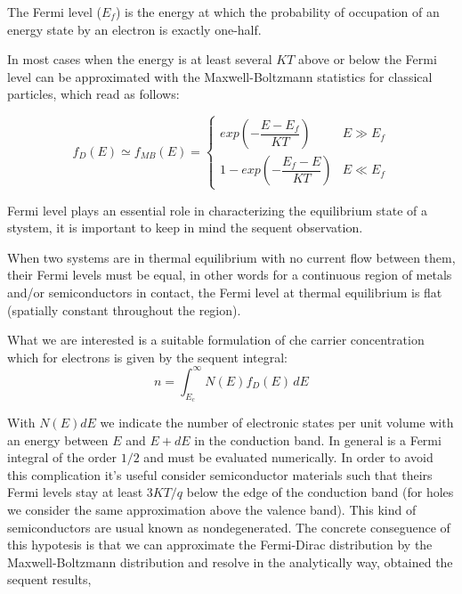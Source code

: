 \begin{Definizione}
The Fermi level ($E_f$) is the energy at which the probability of occupation of an energy state by an electron is exactly one-half.
\end{Definizione}

In most cases when the energy is at least several $KT$ above or below the Fermi level  can be approximated with the Maxwell-Boltzmann statistics for classical particles, which read as follows:

\begin{equation}
\label{eq: maxwell distribution}
f_D(E)\simeq f_{MB}(E) = 
\begin{cases}
exp\left(-\dfrac{E-E_f}{KT}\right) & E\gg E_f \\
1-exp\left(-\dfrac{E_f-E}{KT}\right) & E \ll E_f
\end{cases}
\end{equation}

Fermi level plays an essential role in characterizing the equilibrium state of a stystem, it is important to keep in mind the sequent observation.

\begin{Osservazione}
When two systems are in thermal equilibrium with no current flow between them, their Fermi levels must be equal, in other words for a continuous region of metals and/or semiconductors in contact, the Fermi level at thermal equilibrium is flat (spatially constant throughout the region).
\end{Osservazione}

What we are interested is a suitable formulation of che carrier concentration which for electrons is given by the sequent integral:
\begin{equation}
\label{eq: carrier densiy integral}
n = \int_{E_c}^\infty N(E)f_D(E) \, dE
\end{equation}

With $N(E)dE$ we indicate the number of electronic states per unit volume with an energy between $E$ and $E+dE$ in the conduction band. In general  is a Fermi integral of the order $1/2$ and must be evaluated numerically. In order to avoid this complication it's useful consider semiconductor materials such that theirs Fermi levels stay at least $3KT/q$ below the edge of the conduction band (for holes we consider the same approximation above the valence band). This kind of semiconductors are usual known as nondegenerated. The concrete conseguence of this hypotesis is that we can approximate the Fermi-Dirac distribution by the Maxwell-Boltzmann distribution and resolve  in the analytically way, obtained the sequent results,

